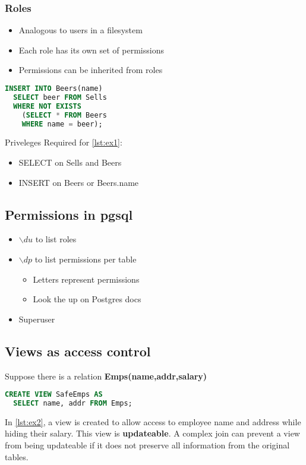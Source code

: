 \documentclass[12pt]{article}
\begin{document}
\subsubsection{Roles}
\begin{itemize}
  \item {Analogous to users in a filesystem}
  \item {Each role has its own set of permissions}
  \item {Permissions can be inherited from roles}
\end{itemize}

\begin{lstlisting}[language=sql,caption=example query,label={lst:ex1}]
  INSERT INTO Beers(name)
  SELECT beer FROM Sells
  WHERE NOT EXISTS
    (SELECT * FROM Beers
    WHERE name = beer);
\end{lstlisting}

Priveleges Required for \autoref{lst:ex1}:
\begin{itemize}
  \item {SELECT on Sells and Beers}
  \item {INSERT on Beers or Beers.name}
\end{itemize}

\subsection{Permissions in pgsql}
\begin{itemize}
  \item {$\backslash du$ to list roles}
  \item {$\backslash dp$ to list permissions per table
    \begin{itemize}
      \item {Letters represent permissions}
      \item {Look the up on Postgres docs}
    \end{itemize}
  }
  \item {Superuser}
\end{itemize}

\subsection{Views as access control}
Suppose there is a relation \textbf{Emps(name,addr,salary)}
\begin{lstlisting}[language=sql,caption=view to control access,label={lst:ex2}]
  CREATE VIEW SafeEmps AS
  SELECT name, addr FROM Emps;
\end{lstlisting}
In \autoref{lst:ex2}, a view is created to allow access to employee name and
address while hiding their salary. This view is \textbf{updateable}.
A complex join can prevent a view from being updateable if it does not preserve
all information from the original tables.
\end{document}
